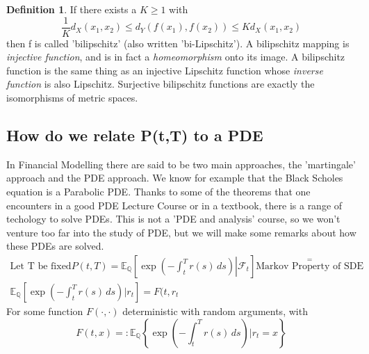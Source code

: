 \documentclass[10pt, oneside, reqno]{amsbook}
\theoremstyle{plain}%
\theoremstyle{definition}
\theoremstyle{rem}
\theoremstyle{definition}
\newtheorem{dfn}[thm]{Definition}
\def\Qbb{\ensuremath{\mathbb{Q}}}
\numberwithin{equation}{chapter}
\begin{document}
\begin{dfn}
If there exists a $K \geq 1$ with
\begin{displaymath}\frac{1}{K}d_X(x_1,x_2) \le d_Y(f(x_1), f(x_2)) \le K d_X(x_1, x_2)\end{displaymath}
then ƒ is called 'bilipschitz' (also written 'bi-Lipschitz').  A bilipschitz mapping is 
\textit{injective function}, and is in fact a 			
\textit{homeomorphism} onto its image.  A bilipschitz function is the same thing as an 
injective Lipschitz function whose 			
\textit{inverse function} is also Lipschitz. 
 Surjective bilipschitz functions are exactly the isomorphisms of metric spaces.
\end{dfn}
\subsection{How do we relate P(t,T) to a PDE}
In Financial Modelling there are said to be two main approaches, the 'martingale' approach and the PDE approach.
We know for example that the Black Scholes equation is a Parabolic PDE. Thanks to some of the theorems that one 
encounters in a good PDE Lecture Course or in a textbook, there is a range of techology to solve PDEs. 
 This is not a 'PDE and analysis' course, so we won't venture too far into the study of PDE, but we will
make some remarks about how these PDEs are solved. 
\begin{align}
 \text{Let T be fixed} P(t,T) = \mathbb{E}_{\Qbb}\left[\left. \exp{\left(-\int_t^T r(s)\, ds\right) } \right| 
\mathcal{F}_t \right] \stackrel{=}{\text{Markov Property of SDE}} \\
\mathbb{E}_{\Qbb} \left[ \exp{\left(-\int_t^T r(s)\, ds\right) } | r_{t}\right] = F(t,r_{t}
\end{align}
For some function $F(\cdot, \cdot)$ deterministic with random arguments, with 
\begin{displaymath}
F(t,x) =: \mathbb{E}_\Qbb \left\lbrace \exp\left(-\int_t^T r(s)\, ds\right)  |r_{t} =x\right\rbrace 
\end{displaymath}
\end{document}
